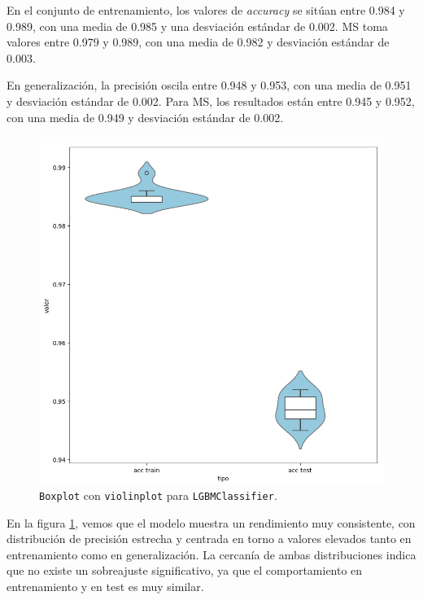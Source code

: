 En el conjunto de entrenamiento, los valores de \textit{accuracy} se sitúan entre 0.984 y 0.989, con una media de 0.985 y una desviación estándar de 0.002. MS toma valores entre 0.979 y 0.989, con una media de 0.982 y desviación estándar de 0.003.

\vspace{1em}

En generalización, la precisión oscila entre 0.948 y 0.953, con una media de 0.951 y desviación estándar de 0.002. Para MS, los resultados están entre 0.945 y 0.952, con una media de 0.949 y desviación estándar de 0.002.

\begin{figure}[H]
	\centering
	\includegraphics[width=1\linewidth]{Imagenes/lgbm_bin}
	\caption[\texttt{Boxplot} con \texttt{violinplot} para \texttt{LGBMClassifier}]{\texttt{Boxplot} con \texttt{violinplot} para \texttt{LGBMClassifier}.}
	\label{fig:lgbm_bin}
\end{figure}

En la figura \ref{fig:lgbm_bin}, vemos que el modelo muestra un rendimiento muy consistente, con distribución de precisión estrecha y centrada en torno a valores elevados tanto en entrenamiento como en generalización. La cercanía de ambas distribuciones indica que no existe un sobreajuste significativo, ya que el comportamiento en entrenamiento y en test es muy similar.

